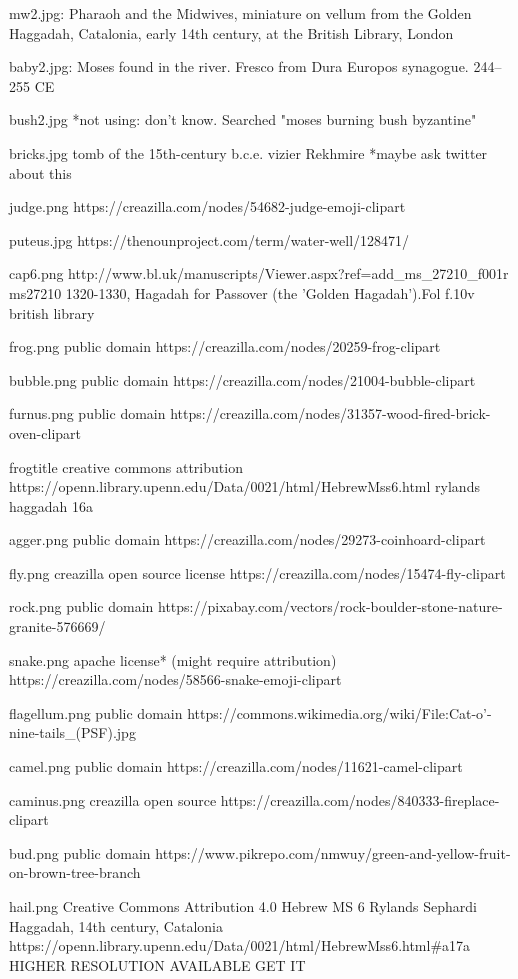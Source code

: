 mw2.jpg:
Pharaoh and the Midwives, miniature on vellum from the Golden Haggadah, Catalonia, early 14th century, at the British Library, London

baby2.jpg:
Moses found in the river. Fresco from Dura Europos synagogue.
244–255 CE

bush2.jpg *not using:
don't know.  Searched "moses burning bush byzantine"

bricks.jpg
tomb of the 15th-century b.c.e. vizier Rekhmire *maybe ask twitter about this

judge.png
https://creazilla.com/nodes/54682-judge-emoji-clipart

puteus.jpg
https://thenounproject.com/term/water-well/128471/

cap6.png
http://www.bl.uk/manuscripts/Viewer.aspx?ref=add_ms_27210_f001r
ms27210 1320-1330, Hagadah for Passover (the 'Golden Hagadah').Fol f.10v
british library 

frog.png
public domain
https://creazilla.com/nodes/20259-frog-clipart

bubble.png
public domain
https://creazilla.com/nodes/21004-bubble-clipart

furnus.png
public domain
https://creazilla.com/nodes/31357-wood-fired-brick-oven-clipart

frogtitle
creative commons attribution
https://openn.library.upenn.edu/Data/0021/html/HebrewMss6.html
rylands haggadah 16a

agger.png
public domain
https://creazilla.com/nodes/29273-coinhoard-clipart

fly.png
creazilla open source license
https://creazilla.com/nodes/15474-fly-clipart

rock.png
public domain
https://pixabay.com/vectors/rock-boulder-stone-nature-granite-576669/

snake.png
apache license* (might require attribution)
https://creazilla.com/nodes/58566-snake-emoji-clipart

flagellum.png
public domain
https://commons.wikimedia.org/wiki/File:Cat-o'-nine-tails_(PSF).jpg

camel.png
public domain
https://creazilla.com/nodes/11621-camel-clipart

caminus.png
creazilla open source
https://creazilla.com/nodes/840333-fireplace-clipart

bud.png
public domain
https://www.pikrepo.com/nmwuy/green-and-yellow-fruit-on-brown-tree-branch

hail.png
Creative Commons Attribution 4.0
Hebrew MS 6 Rylands Sephardi Haggadah, 14th century, Catalonia
https://openn.library.upenn.edu/Data/0021/html/HebrewMss6.html#a17a
HIGHER RESOLUTION AVAILABLE GET IT

